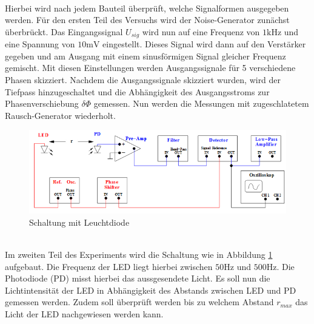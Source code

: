 \\
Hierbei wird nach jedem Bauteil überprüft, welche Signalformen ausgegeben werden.
Für den ersten Teil des Versuchs wird der Noise-Generator zunächst überbrückt.
Das Eingangssignal $U_{sig}$ wird nun auf eine Frequenz von $1\si{\kilo\hertz}$
und eine Spannung von $10\si{\milli\volt}$ eingestellt. Dieses Signal wird dann
auf den Verstärker gegeben und am Ausgang mit einem sinusförmigen Signal gleicher
Frequenz gemischt. Mit diesen Einstellungen werden Ausgangssignale für 5 verschiedene
Phasen skizziert.
Nachdem die Ausgangssignale skizziert wurden, wird der Tiefpass hinzugeschaltet
und die Abhängigkeit des Ausgangsstroms zur Phasenverschiebung
$\delta\Phi$ gemessen.
Nun werden die Messungen mit zugeschlatetem Rausch-Generator wiederholt.
\\
\begin{figure}
  \centering
  \includegraphics[width=\textwidth]{Bilder/LEDSchaltung.jpeg}
  \caption{Schaltung mit Leuchtdiode}
  \label{fig:led}
\end{figure}  %
\\
Im zweiten Teil des Experiments wird die Schaltung wie in Abbildung \ref{fig:led}
aufgebaut. Die Frequenz der LED liegt hierbei zwischen $50 \si{\hertz}$ und
$500 \si{\hertz}$. Die Photodiode (PD) misst hierbei das aussgesendete Licht.
Es soll nun die Lichtintensität der LED in Abhängigkeit des Abstands
zwischen LED und PD gemessen werden. Zudem soll überprüft werden bis zu welchem
Abstand $r_{max}$ das Licht der LED nachgewiesen werden kann.
\newpage
